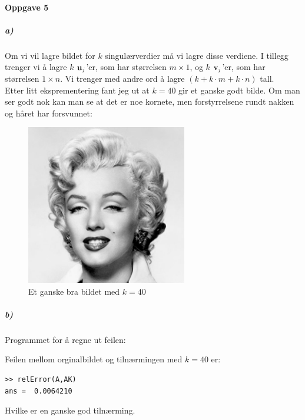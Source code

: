 \documentclass[a4paper,norsk, 10pt]{article}
\begin{document}
\newpage


\paragraph*{Oppgave 5}

\subparagraph*{a)}

Om vi vil lagre bildet for $k$ singulærverdier må vi lagre disse verdiene. I tillegg trenger vi å lagre $k$ $\bold{u}_j$'er, som har størrelsen $m \times 1$, og $k$ $\bold{v}_j$'er, som har størrelsen $1 \times n$. Vi trenger med andre ord å lagre $(k + k\cdot m + k\cdot n)$ tall.\\ 

Etter litt eksprementering fant jeg ut at $k = 40$ gir et ganske godt bilde. Om man ser godt nok kan man se at det er noe kornete, men forstyrrelsene rundt nakken og håret har forsvunnet:

\begin{figure}[H]
\begin{center}
\includegraphics[width = 70mm]{k40.png}
\caption{Et ganske bra bildet med $k = 40$}
\end{center}
\end{figure}

\subparagraph*{b)}

Programmet for å regne ut feilen:



Feilen mellom orginalbildet og tilnærmingen med $k = 40$ er:

\begin{verbatim}
>> relError(A,AK)
ans =  0.0064210
\end{verbatim}

Hvilke er en ganske god tilnærming.
\end{document}
